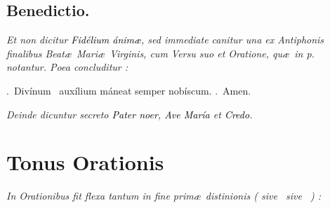 \documentclass[12pt]{article} %
\newenvironment{rubric}{\vspace{1 mm}\color{benred8} \itshape \leftskip 0in \setlength{\parindent}{0.25in}}{\vspace{1 mm}}
\newenvironment{response}{\leftskip 0in \setlength{\parindent}{0in}}{\vspace{1 mm}}
\let\oldgresixstar\gresixstar
\renewcommand{\gresixstar}{\textcolor{benred8}{\oldgresixstar}}
\let\oldgredagger\gredagger
\renewcommand{\gredagger}{\textcolor{benred8}{\oldgredagger}}
\let\oldVbar\Vbar
\renewcommand{\Vbar}{\textcolor{benred8}{\oldVbar .}}
\let\oldRbar\Rbar
\renewcommand{\Rbar}{\textcolor{benred8}{\oldRbar .}}
\let\oldgrealtcross\grealtcross
\renewcommand{\grealtcross}{\textcolor{benred8}{\oldgrealtcross}}
\begin{document}
\vspace{1.5mm}

\subsection*{Benedictio.}

\gresetfirstlineaboveinitial{\small \textsc{ \textbf{\textcolor{benred8}{}}}}{\small \textsc{ \textbf{\textcolor{benred8}{}}}}

\vspace{1.5mm}

\begin{rubric}
Et non dicitur \textcolor{black}{\emph{Fid\'{e}lium \'{a}nim\ae}}, sed immediate canitur una ex Antiphonis finalibus Beat\ae\ Mari\ae\ Virginis, cum Versu suo et Oratione, qu\ae\ in p.~\pageref{sec:AntBMV} notantur. Poea concluditur :

\end{rubric}

\begin{response}
\Vbar\ Div\'{i}num \grealtcross\ aux\'{i}lium m\'{a}neat semper nob\'{i}scum. \Rbar\ Amen.

\end{response}

\begin{rubric}
Deinde dicuntur secreto \textcolor{black}{\emph{Pater noer}}, \textcolor{black}{\emph{Ave Mar\'{i}a}} et \textcolor{black}{\emph{Credo}}.

\end{rubric}

\newpage


\section*{Tonus Orationis}
\label{sec:TonusOrationis}

\thispagestyle{plain}



\vspace{1mm}

\begin{rubric}
In Orationibus fit flexa tantum in fine prim\ae\ distinionis ( sive \gredagger\ sive \gresixstar\ ) :

\end{rubric}
\end{document}
